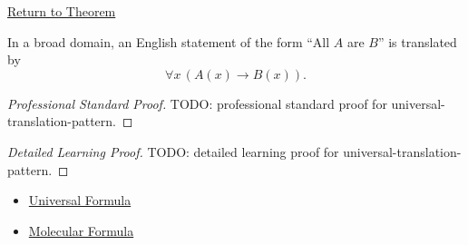 \newpage
{}
\label{prf:universal-translation-pattern}

\begin{remark*}[Return]
\hyperref[prop:universal-translation-pattern]{Return to Theorem}
\end{remark*}

\begin{proposition*}
In a broad domain, an English statement of the form ``All \(A\) are \(B\)''
is translated by
\[
\forall x\,(A(x)\to B(x)).
\]
\end{proposition*}

\begin{proof}[Professional Standard Proof]
\LRAProofBodyStart
TODO: professional standard proof for universal-translation-pattern.
\end{proof}

\begin{proof}[Detailed Learning Proof]
\LRAProofBodyStart
TODO: detailed learning proof for universal-translation-pattern.
\end{proof}

\begin{remark*}
\end{remark*}

\begin{dependencies}
\begin{itemize}
  \item \hyperref[def:universal-q]{Universal Formula}
  \item \hyperref[def:molecular]{Molecular Formula}
\end{itemize}
\end{dependencies}

\clearpage
